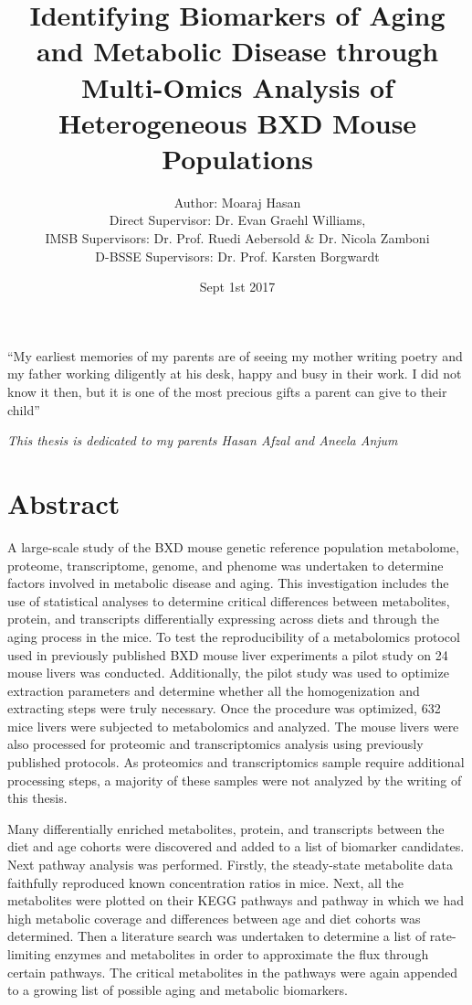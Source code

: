 \documentclass[a4paper,11pt,twoside]{book}
\title{Identifying Biomarkers of Aging and Metabolic Disease through Multi-Omics Analysis of Heterogeneous BXD Mouse Populations}
\author{Author: Moaraj Hasan\\
	Direct Supervisor: Dr. Evan Graehl Williams, \\
	IMSB Supervisors: Dr. Prof. Ruedi Aebersold \& Dr. Nicola Zamboni \\
	D-BSSE Supervisors: Dr. Prof. Karsten Borgwardt }
\date{Sept 1st 2017}
\begin{document}
	
	\maketitle
	\let\cleardoublepage\clearpage
	
	\chapter*{}
	
	\epigraph{“My earliest memories of my parents are of seeing my mother writing poetry and my father working diligently at his desk, happy and busy in their work. I did not know it then, but it is one of the most precious gifts a parent can give to their child”}{\textit{This thesis is dedicated to my parents Hasan Afzal and Aneela Anjum}}
	
	\let\cleardoublepage\clearpage
	
	{
		\tableofcontents{}
	}
	
	\chapter*{Abstract} 

A large-scale study of the BXD mouse genetic reference population metabolome, proteome, transcriptome, genome, and phenome was undertaken to determine factors involved in metabolic disease and aging. This investigation includes the use of statistical analyses to determine critical differences between metabolites, protein, and transcripts differentially expressing across diets and through the aging process in the mice. 
To test the reproducibility of a metabolomics protocol used in previously published BXD mouse liver experiments a pilot study on 24 mouse livers was conducted. Additionally, the pilot study was used to optimize extraction parameters and determine whether all the homogenization and extracting steps were truly necessary. Once the procedure was optimized, 632 mice livers were subjected to metabolomics and analyzed. The mouse livers were also processed for proteomic and transcriptomics analysis using previously published protocols. As proteomics and transcriptomics sample require additional processing steps, a majority of these samples were not analyzed by the writing of this thesis.

Many differentially enriched metabolites, protein, and transcripts between the diet and age cohorts were discovered and added to a list of biomarker candidates. Next pathway analysis was performed. Firstly, the steady-state metabolite data faithfully reproduced known concentration ratios in mice. Next, all the metabolites were plotted on their KEGG pathways and pathway in which we had high metabolic coverage and differences between age and diet cohorts was determined. Then a literature search was undertaken to determine a list of rate-limiting enzymes and metabolites in order to approximate the flux through certain pathways. The critical metabolites in the pathways were again appended to a growing list of possible aging and metabolic biomarkers. 
\end{document}
